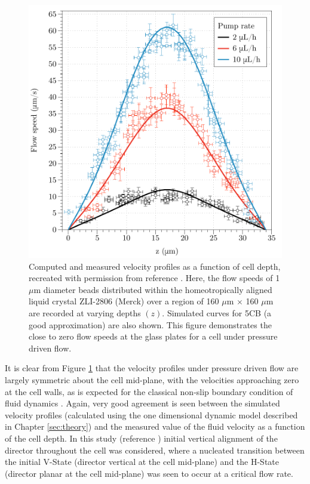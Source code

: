 \begin{figure}
\begin{center}
\includegraphics{Figures/45/sharon_flow}
\end{center}
\caption[Computed and measured velocity profiles as a function of cell depth]{\label{fig:sharon_flow}Computed and measured velocity profiles as a function of cell depth, recreated with permission from reference \cite{Jewell2009}. Here, the flow speeds of 1 $\mu$m diameter beads distributed within the homeotropically aligned liquid crystal ZLI-2806 (Merck) over a region of 160 $\mu$m $\times$ 160 $\mu$m are recorded at varying depths $\left(z\right)$. Simulated curves for 5CB (a good approximation) are also shown. This figure demonstrates the close to zero flow speeds at the glass plates for a cell under pressure driven flow.}
\end{figure}

It is clear from Figure \ref{fig:sharon_flow} that the velocity profiles under pressure driven flow are largely symmetric about the cell mid-plane, with the velocities approaching zero at the cell walls, as is expected for the classical non-slip boundary condition of fluid dynamics \cite{Feynmann1964}. Again, very good agreement is seen between the simulated velocity profiles (calculated using the one dimensional dynamic model described in Chapter \ref{sec:theory}) and the measured value of the fluid velocity as a function of the cell depth. In this study (reference \cite{Jewell2009}) initial vertical alignment of the director throughout the cell was considered, where a nucleated transition between the initial V-State (director vertical at the cell mid-plane) and the H-State (director planar at the cell mid-plane) was seen to occur at a critical flow rate.

